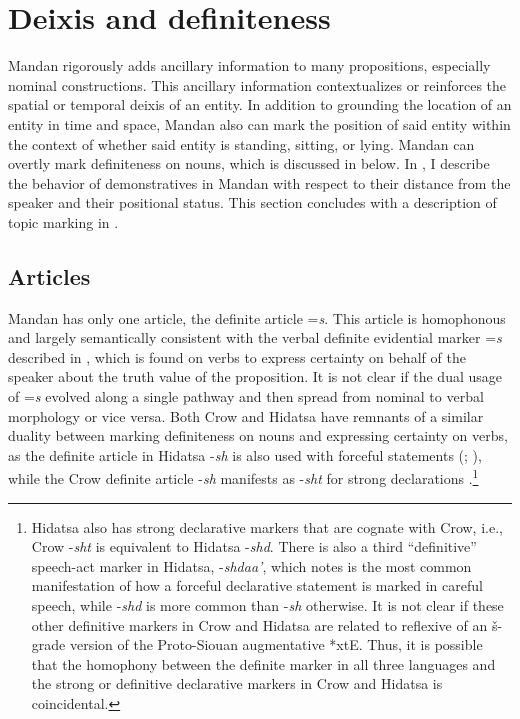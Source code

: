 \section{Deixis and definiteness}\label{SecDeixis}

Mandan rigorously adds ancillary information to many propositions, especially nominal constructions. This ancillary information contextualizes or reinforces the spatial or temporal deixis of an entity. In addition to grounding the location of an entity in time and space, Mandan also can mark the position of said entity within the context of whether said entity is standing, sitting, or lying. Mandan can overtly mark definiteness on nouns, which is discussed in  below. In , I describe the behavior of demonstratives in Mandan with respect to their distance from the speaker and their positional status. This section concludes with a description of topic marking in .

\subsection{Articles}\label{SubSecArticles}

Mandan has only one article, the definite article =\textit{s}. This article is homophonous and largely semantically consistent with the verbal definite evidential marker =\textit{s} described in , which is found on verbs to express certainty on behalf of the speaker about the truth value of the proposition. It is not clear if the dual usage of =\textit{s} evolved along a single pathway and then spread from nominal to verbal morphology or vice versa. Both Crow and Hidatsa have remnants of a similar duality between marking definiteness on nouns and expressing certainty on verbs, as the definite article in Hidatsa -\textit{sh} is also used with forceful statements (\citealt[68]{boyle2007}; \citealt[231]{park2012}), while the Crow definite article -\textit{sh} manifests as -\textit{sht} for strong declarations \citep[394]{graczyk2007}.\footnote{Hidatsa also has strong declarative markers that are cognate with Crow, i.e., Crow -\textit{sht} is equivalent to Hidatsa -\textit{shd}. There is also a third ``definitive'' speech-act marker in Hidatsa, -\textit{shdaa'}, which \citet[231]{park2012} notes is the most common manifestation of how a forceful declarative statement is marked in careful speech, while -\textit{shd} is more common than -\textit{sh} otherwise. It is not clear if these other definitive markers in Crow and Hidatsa are related to reflexive of an š-grade version of the Proto-Siouan augmentative *xtE. Thus, it is possible that the homophony between the definite marker in all three languages and the strong or definitive declarative markers in Crow and Hidatsa is coincidental.}

